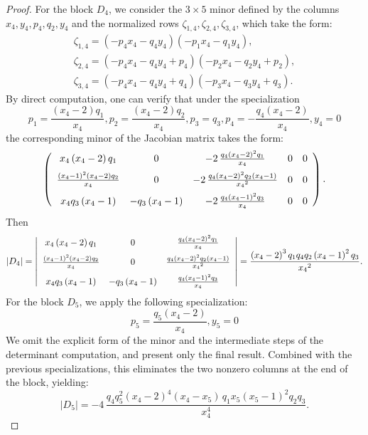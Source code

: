 \documentclass[12pt,reqno]{amsart}
\begin{document}
\begin{proof}
For the block \(D_4\), we consider the \(3 \times 5\) minor defined by the columns \(x_4, y_4, p_4, q_2, y_4\) and the normalized rows \(\zeta_{1,4}, \zeta_{2,4}, \zeta_{3,4}\), which take the form:
\begin{gather*}
\zeta_{{1,4}}= \left( -p_{{4}}x_{{4}}-q_{{4}}y_{{4}} \right)  \left( -p_{{1}}x_{{4}}-q_{{1}}y_{{4}} \right),\\
\zeta_{{2,4}}= \left( -p_{{4}}
x_{{4}}-q_{{4}}y_{{4}}+p_{{4}} \right)  \left( -p_{{2}}x_{{4}}-q_{{2}}
y_{{4}}+p_{{2}} \right),\\
\zeta_{{3,4}}= \left( -p_{{4}}x_{{4}}-q_{{4}}
y_{{4}}+q_{{4}} \right)  \left( -p_{{3}}x_{{4}}-q_{{3}}y_{{4}}+q_{{3}}
 \right). 
\end{gather*}
By direct computation, one can verify that under the specialization 
$$
 p_{{1}}={\frac { \left( x_{{4}}-2 \right) q_{{1}}}{x_{{4}}}},p_{{2}}={\frac { \left( x_{{4}}-2 \right) q_{{2}}}{x_{{4}}}},p_{{3}}=q
_{{3}},p_{{4}}=-{\frac {q_{{4}} \left( x_{{4}}-2 \right) }{x_{{4}}}},y_{{4}}=0
$$
the corresponding minor of the Jacobian matrix takes the form:
$$
\left( \begin {array}{ccccc} x_{{4}} \left( x_{{4}}-2 \right) q_{{1}}&0&-2\,{\frac {q_{{4}} \left( x_{{4}}-2 \right) ^{2}q_{{1}}}{x_{{4}}}}
&0&0\\ \noalign{\medskip}{\frac { \left( x_{{4}}-1 \right) ^{2}
 \left( x_{{4}}-2 \right) q_{{2}}}{x_{{4}}}}&0&-2\,{\frac {q_{{4}}
 \left( x_{{4}}-2 \right) ^{2}q_{{2}} \left( x_{{4}}-1 \right) }{{x_{{
4}}}^{2}}}&0&0\\ \noalign{\medskip}x_{{4}}q_{{3}} \left( x_{{4}}-1
 \right) &-q_{{3}} \left( x_{{4}}-1 \right) &-2\,{\frac {q_{{4}}
 \left( x_{{4}}-1 \right) ^{2}q_{{3}}}{x_{{4}}}}&0&0\end {array}\right).
$$
Then 
$$
|D_4|= \left|\begin {array}{ccc} x_{{4}} \left( x_{{4}}-2 \right) q_{{1}}&0&{\frac {q_{{4}} \left( x_{{4}}-2 \right) ^{2}q_{{1}}}{x_{{4}}}}
\\ \noalign{\medskip}{\frac { \left( x_{{4}}-1 \right) ^{2} \left( x_{
{4}}-2 \right) q_{{2}}}{x_{{4}}}}&0&{\frac {q_{{4}} \left( x_{{4}}
-2 \right) ^{2}q_{{2}} \left( x_{{4}}-1 \right) }{{x_{{4}}}^{2}}}
\\ \noalign{\medskip}x_{{4}}q_{{3}} \left( x_{{4}}-1 \right) &-q_{{3}}
 \left( x_{{4}}-1 \right) &{\frac {q_{{4}} \left( x_{{4}}-1
 \right) ^{2}q_{{3}}}{x_{{4}}}}\end {array} \right|={\frac { \left( x_{{4}}-2 \right) ^{3}q_{{1}}q_{{4}}q_{{2}}
 \left( x_{{4}}-1 \right) ^{2}q_{{3}}}{{x_{{4}}}^{2}}}
.
$$
For the block \(D_5\), we apply the following specialization:
$$
p_{{5}}={\frac {q_{{5}} \left( x_{{4}}-2 \right) }{x_{{4}}}},y_{{5}
}=0 
$$
We omit the explicit form of the minor and the intermediate steps of the determinant computation, and present only the final result. Combined with the previous specializations, this eliminates the two nonzero columns at the end of the block, yielding:
\[
|D_5| = -4\,\frac{q_4 q_5^2 (x_4 - 2)^4 (x_4 - x_5)\, q_1 x_5 (x_5 - 1)^2 q_2 q_3}{x_4^4}.
\]






\end{proof}
\end{document}
